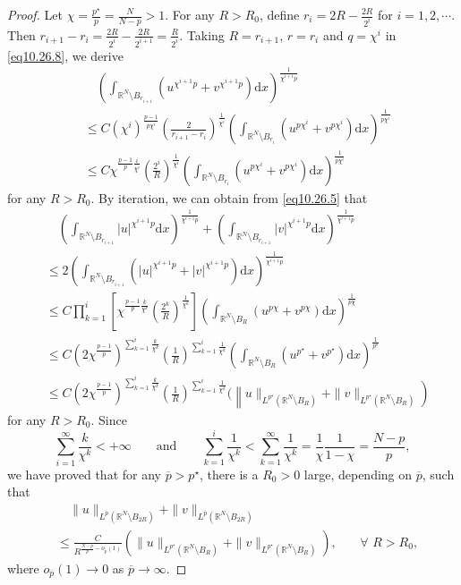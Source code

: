 \documentclass[12pt]{amsart}
\theoremstyle{definition}
\theoremstyle{remark}
\theoremstyle{conclusion}
\theoremstyle{conjecture}
\numberwithin{equation}{section}
\newcommand{\R}{\mathbb{R}}
\begin{document}
\begin{proof}
Let $\chi=\frac{p^{\star}}{p}=\frac{N}{N-p}>1$. For any $R>R_0$, define $r_i = 2R - \frac{2R}{2^i}$ for $i=1,2,\cdots$. Then $r_{i+1}-r_i= \frac{2R}{2^i} -\frac{2R}{2^{i+1}}=\frac{R}{2^i}$. Taking $R=r_{i+1}$, $r=r_i$ and $q=\chi^i$ in \eqref{eq10.26.8}, we derive
\begin{align}\label{eq10.26.5}
&\quad \left(\int_{\R^N \setminus B_{r_{i+1}}} (u^{\chi^{i+1}p}+v^{\chi^{i+1}p}) \mathrm{d}x \right)^\frac{1}{\chi^{i+1} p}\\
& \leq C (\chi^i)^\frac{p-1}{p\chi^i} \left(\frac{2}{r_{i+1}-r_i}\right)^\frac{1}{\chi^i} \left(\int_{\R^N \setminus B_{r_i}} (u^{p \chi^i}+v^{p \chi^i}) \mathrm{d}x\right)^\frac{1}{p\chi^i}\nonumber \\
& \leq C \chi^{ \frac{p-1}{p} \frac{i}{\chi^i} } \left(\frac{2^i}{R}\right)^\frac{1}{\chi^i} \left(\int_{\R^N \setminus B_{r_i}} (u^{p \chi^i}+v^{p \chi^i}) \mathrm{d}x\right)^\frac{1}{p\chi^i} \nonumber
\end{align}
for any $R>R_0$. By iteration, we can obtain from \eqref{eq10.26.5} that
\begin{align}\label{eq10.26.6}
&\quad \left(\int_{\R^N \setminus B_{r_{i+1}}} |u|^{\chi^{i+1} p} \mathrm{d}x \right)^\frac{1}{\chi^{i+1} p}+\left(\int_{\R^N \setminus B_{r_{i+1}}} |v|^{\chi^{i+1} p} \mathrm{d}x \right)^\frac{1}{\chi^{i+1} p} \\
& \leq 2\left(\int_{\R^N \setminus B_{r_{i+1}}} (|u|^{\chi^{i+1}p}+|v|^{\chi^{i+1}p}) \mathrm{d}x \right)^\frac{1}{\chi^{i+1} p} \nonumber \\
& \leq C \prod^i_{k=1} \left[ \chi^{ \frac{p-1}{p} \frac{k}{\chi^k} } \left(\frac{2^k}{R}\right)^\frac{1}{\chi^k} \right] \left(\int_{\R^N \setminus B_{R}} (u^{p \chi}+v^{p \chi}) \mathrm{d}x\right)^\frac{1}{p\chi} \nonumber\\
& \leq C   \left( 2 \chi^\frac{p-1}{p}\right)^{\sum\limits^i_{k=1}\frac{k}{\chi^k} } \left(\frac{1}{R}\right)^{\sum\limits^i_{k=1}\frac{1}{\chi^k}}
\left(\int_{\R^N \setminus B_{R}} (u^{p^{\star}}+v^{p^{\star}}) \mathrm{d}x\right)^\frac{1}{p^{\star}} \nonumber\\
& \leq C   \left( 2 \chi^\frac{p-1}{p}\right)^{\sum\limits^i_{k=1}\frac{k}{\chi^k} } \left(\frac{1}{R}\right)^{\sum\limits^i_{k=1}\frac{1}{\chi^k}}(\left\| u \|_{L^{p^{\star}}(\R^N \setminus B_{R})}+\| v\|_{L^{p^{\star}}(\R^N \setminus B_{R})}\right)\nonumber
\end{align}
for any $R>R_0$. Since
$$\sum_{i=1}^\infty \frac{k}{\chi^k} < + \infty \qquad \text{and} \qquad \sum_{k=1}^i \frac{1}{\chi^k} < \sum_{k=1}^\infty \frac{1}{\chi^k}=\frac{1}{\chi}\frac{1}{1-\chi}=\frac{N-p}{p},$$
we have proved that for any $\overline{p}>p^{\star}$, there is a $R_0>0$ large, depending on $\overline{p}$, such that
\begin{align}\label{eq10.26.7}
&\quad \| u \|_{L^{\overline{p}}(\R^N \setminus B_{2R})}+\| v \|_{L^{\overline{p}}(\R^N \setminus B_{2R})} \\ &\leq \frac{C}{R^{ \frac{N-p}{p}-o_{\overline{p}}(1)} }
(\| u \|_{L^{p^{\star}}(\R^N \setminus B_{R})}+\| v\|_{L^{p^{\star}}(\R^N \setminus B_{R})}),\,\quad\,\,\, \,\forall \,\, R>R_0, \nonumber
\end{align}
where $o_{\overline{p}}(1)\to 0$ as $\overline{p} \to \infty$.


\end{proof}
\end{document}
